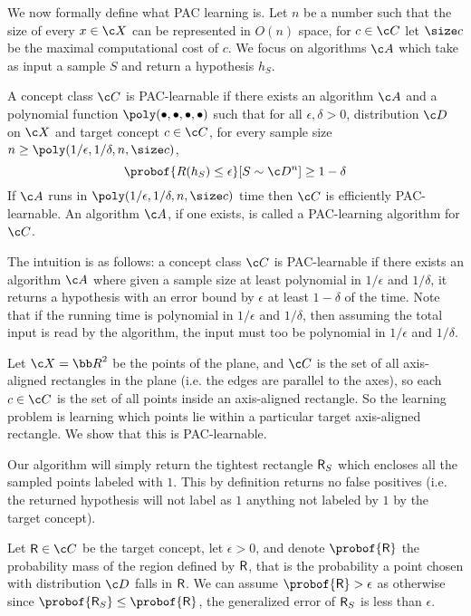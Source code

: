 We now formally define what PAC learning is.
Let $n$ be a number such that the size of every $x\in\c X$ can be represented in $O(n)$ space, for $c\in\c C$ let $\size c$ be the maximal computational cost of $c$.
We focus on algorithms $\c A$ which take as input a sample $S$ and return a hypothesis $h_S$.

\bdefn

    A concept class $\c C$ is {\emphcolor PAC-learnable} if there exists an algorithm $\c A$ and a polynomial function $\poly(\bullet,\bullet,\bullet,\bullet)$ such that for all $\epsilon,\delta>0$,
    distribution $\c D$ on $\c X$ and target concept $c\in\c C$, for every sample size $n\geq\poly(1/\epsilon,1/\delta,n,\size c)$,
    $$ \probof{R(h_S)\leq\epsilon}[S\sim\c D^n] \geq 1 - \delta $$
    If $\c A$ runs in $\poly(1/\epsilon,1/\delta,n,\size c)$ time then $\c C$ is {\emphcolor efficiently PAC-learnable}.
    An algorithm $\c A$, if one exists, is called a {\emphcolor PAC-learning algorithm} for $\c C$.

\edefn

The intuition is as follows: a concept class $\c C$ is PAC-learnable if there exists an algorithm $\c A$ where given a sample size at least polynomial in $1/\epsilon$ and $1/\delta$, it returns a hypothesis
with an error bound by $\epsilon$ at least $1-\delta$ of the time.
Note that if the running time is polynomial in $1/\epsilon$ and $1/\delta$, then assuming the total input is read by the algorithm, the input must too be polynomial in $1/\epsilon$ and $1/\delta$.

\bexam

    Let $\c X={\bb R}^2$ be the points of the plane, and $\c C$ is the set of all axis-aligned rectangles in the plane (i.e. the edges are parallel to the axes), so each $c\in\c C$ is the set of all points
    inside an axis-aligned rectangle.
    So the learning problem is learning which points lie within a particular target axis-aligned rectangle.
    We show that this is PAC-learnable.

    Our algorithm will simply return the tightest rectangle ${\sf R}_S$ which encloses all the sampled points labeled with $1$.
    This by definition returns no false positives (i.e. the returned hypothesis will not label as $1$ anything not labeled by $1$ by the target concept).

    Let ${\sf R}\in\c C$ be the target concept, let $\epsilon>0$, and denote $\probof{\sf R}$ the probability mass of the region defined by $\sf R$, that is the probability a point chosen with distribution
    $\c D$ falls in ${\sf R}$.
    We can assume $\probof{\sf R}>\epsilon$ as otherwise since $\probof{{\sf R}_S}\leq\probof{\sf R}$, the generalized error of ${\sf R}_S$ is less than $\epsilon$.

\eexam
